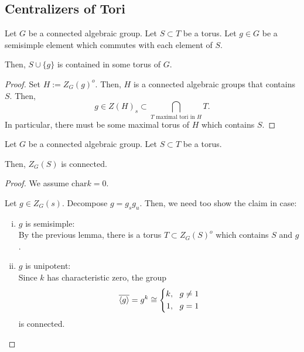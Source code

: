 \subsection{Centralizers of Tori}

\begin{lemma}
	Let $G$ be a connected algebraic group. Let $S\subset T$ be a torus. Let $g \in G$ be a semisimple element which commutes with each element of $S$.
	
	Then, $S\cup\{g\}$ is contained in some torus of $G$.
\end{lemma}
\begin{proof}
	Set $H := Z_G(g)^o$. Then, $H$ is a connected algebraic groups that contains $S$. Then,
	\[ g \in Z(H)_s \subset \bigcap_{T \text{ maximal tori in }H}T. \]
	In particular, there must be some maximal torus of $H$ which contains $S$.
\end{proof}

\begin{theorem}
	Let $G$ be a connected algebraic group. Let $S\subset T$ be a torus.
	
	Then, $Z_G(S)$ is connected.
\end{theorem}
\begin{proof}
	We assume $\mathrm{char} k = 0$.
	
	Let $g \in Z_G(s)$. Decompose $g = g_sg_u$. Then, we need too show the claim in case:
	\begin{enumerate}[(i)]
		\item $g$ is semisimple:\\
		By the previous lemma, there is a torus $T\subset Z_G(S)^o$ which contains $S$ and $g$.
		\item $g$ is unipotent:\\
		Since $k$ has characteristic zero, the group
		\[ \overline{\left<g\right>} = g^k \overset{}{\cong} \left\lbrace 
		\begin{aligned}
		k, ~~ g\neq 1 \\ 1, ~~ g = 1
		\end{aligned}
		\right. \]
		is connected.
	\end{enumerate}
\end{proof}